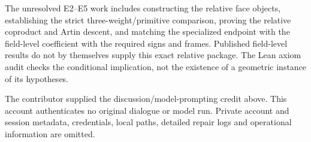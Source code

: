 \documentclass[11pt]{article}
\begin{document}
The unresolved E2--E5 work includes constructing the relative face objects,
establishing the strict three-weight/primitive comparison, proving the
relative coproduct and Artin descent, and matching the specialized endpoint
with the field-level coefficient with the required signs and frames.
Published field-level results do not by themselves supply this exact
relative package. The Lean axiom audit checks the conditional implication,
not the existence of a geometric instance of its hypotheses.

The contributor supplied the discussion/model-prompting credit above.
This account authenticates no original dialogue or model run. Private
account and session metadata, credentials, local paths, detailed repair
logs and operational information are omitted.
\end{document}
